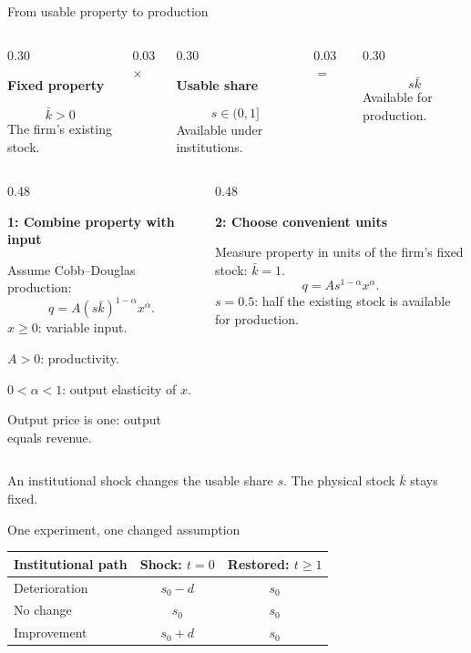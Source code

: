 \documentclass[aspectratio=169,11pt]{beamer}
\newcommand{\kwTurq}[1]{{\color{turquoise}#1}}
\newcommand{\labeltext}[1]{\par{\small\bfseries\color{blue}#1\par}\vspace{1.5mm}}
\newcommand{\takeaway}[1]{\par\vspace{2.5mm}\begingroup\setlength{\fboxsep}{2.5mm}\colorbox{pale}{\begin{minipage}{\dimexpr\linewidth-5mm\relax}\small\raggedright #1\end{minipage}}\endgroup\par}
\newcommand{\panel}[3]{\begingroup\setlength{\fboxsep}{2.5mm}\colorbox{#1}{\begin{minipage}[t]{\dimexpr#2-5mm\relax}\raggedright #3\end{minipage}}\endgroup}
\begin{document}
\begin{frame}{From \kwTurq{usable property} to production}
 \begin{columns}[T,onlytextwidth]
 \begin{column}{0.30\textwidth}\panel{pale}{\linewidth}{\centering\labeltext{Fixed property}\[\bar k>0\]\small The firm's existing stock.}\end{column}
 \begin{column}{0.03\textwidth}\vspace{8mm}$\times$\end{column}
 \begin{column}{0.30\textwidth}\panel{pale}{\linewidth}{\centering\labeltext{Usable share}\[s\in(0,1]\]\small Available under institutions.}\end{column}
 \begin{column}{0.03\textwidth}\vspace{8mm}$=$\end{column}
 \begin{column}{0.30\textwidth}\panel{paleteal}{\linewidth}{\centering\labeltext{\kwTurq{Usable property}}\[s\bar k\]\small Available for production.}\end{column}
 \end{columns}
 \vspace{4mm}
 \begin{columns}[T,onlytextwidth]
 \begin{column}{0.48\textwidth}
 \labeltext{1: Combine property with input}
 \small Assume Cobb--Douglas production:
 \[q=A(s\bar k)^{1-\alpha}x^\alpha.\]
 $x\geq0$: variable input.\par
 $A>0$: productivity.\par
 $0<\alpha<1$: output elasticity of $x$.\par
 \vspace{1mm}Output price is one: output equals revenue.
 \end{column}
 \begin{column}{0.48\textwidth}
 \labeltext{2: Choose convenient units}
 \small Measure property in units of the firm's fixed stock: $\bar k=1$.
 \[\boxed{q=As^{1-\alpha}x^\alpha.}\]
 \kwTurq{$s=0.5$:} half the existing stock is available for production.
 \end{column}
 \end{columns}
 \takeaway{An institutional shock changes the usable share $s$. The physical stock $\bar k$ stays fixed.}
\end{frame}

\begin{frame}[c]{One experiment, \kwTurq{one changed assumption}}
 \centering\small\renewcommand{\arraystretch}{1.3}
 \begin{tabular}{@{}lcc@{}}\toprule
 Institutional path & Shock: $t=0$ & Restored: $t\geq1$\\\midrule
 Deterioration & $s_0-d$ & $s_0$\\
 No change & $s_0$ & $s_0$\\
 Improvement & $s_0+d$ & $s_0$\\\bottomrule
 \end{tabular}\par
\end{frame}
\end{document}
